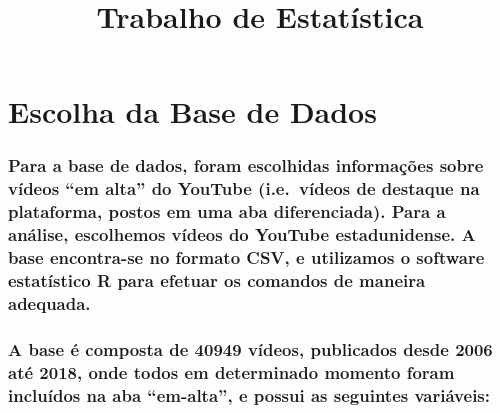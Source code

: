\documentclass[]{article}
\title{Trabalho de Estatística}
\author{}
\date{}
\begin{document}
\maketitle

\hypertarget{escolha-da-base-de-dados}{%
\section{Escolha da Base de Dados}\label{escolha-da-base-de-dados}}

\hypertarget{para-a-base-de-dados-foram-escolhidas-informacoes-sobre-videos-em-alta-do-youtube-i.e.videos-de-destaque-na-plataforma-postos-em-uma-aba-diferenciada.-para-a-analise-escolhemos-videos-do-youtube-estadunidense.-a-base-encontra-se-no-formato-csv-e-utilizamos-o-software-estatistico-r-para-efetuar-os-comandos-de-maneira-adequada.}{%
\subsubsection{Para a base de dados, foram escolhidas informações sobre
vídeos ``em alta'' do YouTube (i.e.~vídeos de destaque na plataforma,
postos em uma aba diferenciada). Para a análise, escolhemos vídeos do
YouTube estadunidense. A base encontra-se no formato CSV, e utilizamos o
software estatístico R para efetuar os comandos de maneira
adequada.}\label{para-a-base-de-dados-foram-escolhidas-informacoes-sobre-videos-em-alta-do-youtube-i.e.videos-de-destaque-na-plataforma-postos-em-uma-aba-diferenciada.-para-a-analise-escolhemos-videos-do-youtube-estadunidense.-a-base-encontra-se-no-formato-csv-e-utilizamos-o-software-estatistico-r-para-efetuar-os-comandos-de-maneira-adequada.}}

\hypertarget{a-base-e-composta-de-40949-videos-publicados-desde-2006-ate-2018-onde-todos-em-determinado-momento-foram-incluidos-na-aba-em-alta-e-possui-as-seguintes-variaveis}{%
\subsubsection{A base é composta de 40949 vídeos, publicados desde 2006
até 2018, onde todos em determinado momento foram incluídos na aba
``em-alta'', e possui as seguintes
variáveis:}\label{a-base-e-composta-de-40949-videos-publicados-desde-2006-ate-2018-onde-todos-em-determinado-momento-foram-incluidos-na-aba-em-alta-e-possui-as-seguintes-variaveis}}
\end{document}

